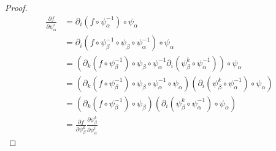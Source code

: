 \documentclass[dvipdfmx]{jsarticle}
\begin{document}
\begin{proof}
\begin{comment}
&= \frac{\partial f}{\partial \psi_\beta^k } \frac{\partial \psi_\beta^k }{\partial \psi_\alpha^i }
\end{align*}
\end{comment}
\begin{align*}
  \frac{\partial f}{\partial \psi_\alpha^i } &=\partial_i \left( f\circ \psi_\alpha^{-1} \right) \circ \psi_\alpha \\
  &=\partial_i \left( f\circ \psi_\beta^{-1} \circ \psi_\beta \circ \psi_\alpha^{-1} \right) \circ \psi_\alpha \\
  &=\left( \partial_k \left( f\circ \psi_\beta^{-1} \right) \circ \psi_\beta \circ \psi_\alpha^{-1} \partial_i \left( \psi_\beta^k \circ \psi_\alpha^{-1} \right) \right) \circ \psi_\alpha \\
  &=\left( \partial_k \left( f\circ \psi_\beta^{-1} \right) \circ \psi_\beta \circ \psi_\alpha^{-1} \circ \psi_\alpha \right) \left( \partial_i \left( \psi_\beta^k \circ \psi_\alpha^{-1} \right) \circ \psi_\alpha \right) \\
  &=\left( \partial_k \left( f\circ \psi_\beta^{-1} \right) \circ \psi_\beta \right) \left( \partial_i \left( \psi_\beta^k \circ \psi_\alpha^{-1} \right) \circ \psi_\alpha \right) \\
  &= \frac{\partial f}{\partial \psi_\beta^k } \frac{\partial \psi_\beta^k }{\partial \psi_\alpha^i }
\end{align*}
\end{proof}
\end{document}
